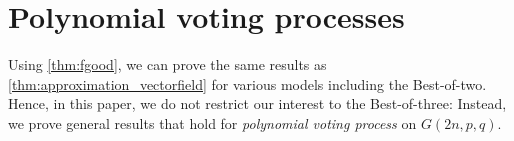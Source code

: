 \documentclass[letterpaper,11pt]{article}
\renewcommand\Pr{\mathop{\mathbf{Pr}}}
\def\defeq{\mathrel{\mathop:}=}%
\begin{document}




\section{Polynomial voting processes
\label{sec:polynomialvoting}}
Using \cref{thm:fgood}, we can prove the same results as \cref{thm:approximation_vectorfield} for various models including the Best-of-two.
Hence, in this paper, we do not restrict our interest to the Best-of-three: Instead, we prove general results that hold for \emph{polynomial voting process} on $G(2n,p,q)$.
\end{document}
